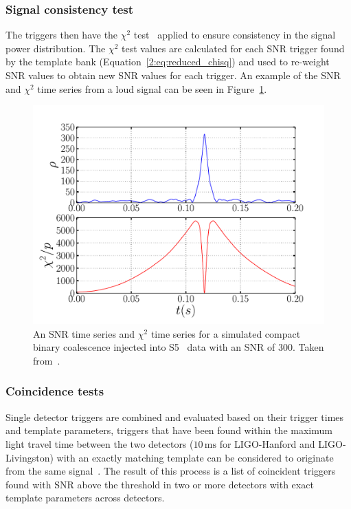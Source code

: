 \subsubsection{Signal consistency test}

The triggers then have the $\chi^{2}$ test~\cite{Allen_Chi:2005} applied to ensure consistency in the signal power distribution. The $\chi^{2}$ test values are calculated for each SNR trigger found by the template bank (Equation~\ref{2:eq:reduced_chisq}) and used to re-weight SNR values to obtain new SNR values for each trigger. An example of the SNR and $\chi^{2}$ time series from a loud signal can be seen in Figure~\ref{2:fig:snr-timeseries}.
%
\begin{figure}
    \centering
    \includegraphics[width=0.75\linewidth]{images/2_searches/ihope_snr_timeseries.pdf}
    \caption{An SNR time series and $\chi^{2}$ time series for a simulated compact binary coalescence injected into S5~\cite{S5:2012} data with an SNR of $300$. Taken from~\cite{IHOPE:2012zx}.}
    \label{2:fig:snr-timeseries}
\end{figure}
%

\subsubsection{Coincidence tests}

Single detector triggers are combined and evaluated based on their trigger times and template parameters, triggers that have been found within the maximum light travel time between the two detectors ($10 \, \text{ms}$ for LIGO-Hanford and LIGO-Livingston) with an exactly matching template can be considered to originate from the same \gwadj signal~\cite{Robinson:2008}. The result of this process is a list of coincident triggers found with SNR above the threshold in two or more detectors with exact template parameters across detectors.


